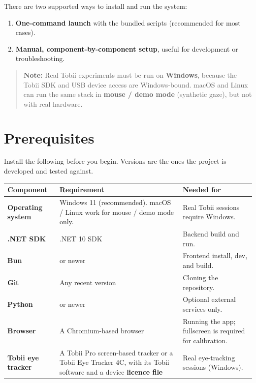 There are two supported ways to install and run the system:

\begin{enumerate}
\def\labelenumi{\arabic{enumi}.}
\tightlist
\item
  \textbf{One-command launch} with the bundled scripts (recommended for most cases).
\item
  \textbf{Manual, component-by-component setup}, useful for development or troubleshooting.
\end{enumerate}

\begin{quote}
\textbf{Note:} Real Tobii experiments must be run on \textbf{Windows}, because the Tobii SDK and USB
device access are Windows-bound. macOS and Linux can run the same stack in \textbf{mouse / demo
mode} (synthetic gaze), but not with real hardware.
\end{quote}

\FloatBarrier
\section{Prerequisites}\label{2-prerequisites}

Install the following before you begin. Versions are the ones the project is developed and tested
against.

{\small{} %
\begin{longtable}[]{@{}
  >{\raggedright\arraybackslash}p{}
  >{\raggedright\arraybackslash}p{}
  >{\raggedright\arraybackslash}p{}@{}}
\toprule\noalign{}
\begin{minipage}[b]{\linewidth}\raggedright
Component
\end{minipage} & \begin{minipage}[b]{\linewidth}\raggedright
Requirement
\end{minipage} & \begin{minipage}[b]{\linewidth}\raggedright
Needed for
\end{minipage} \\
\midrule\noalign{}
\endhead
\bottomrule\noalign{}
\endlastfoot
\textbf{Operating system} & Windows 11 (recommended). macOS / Linux work for mouse / demo mode only. & Real Tobii sessions require Windows. \\
\textbf{.NET SDK} & .NET 10 SDK & Backend build and run. \\
\textbf{Bun} & 1.3 or newer & Frontend install, dev, and build. \\
\textbf{Git} & Any recent version & Cloning the repository. \\
\textbf{Python} & 3.11 or newer & Optional external services only. \\
\textbf{Browser} & A Chromium-based browser & Running the app; fullscreen is required for calibration. \\
\textbf{Tobii eye tracker} & A Tobii Pro screen-based tracker or a Tobii Eye Tracker 4C, with its Tobii software and a device \textbf{licence file} & Real eye-tracking sessions (Windows). \\
\end{longtable}
}

